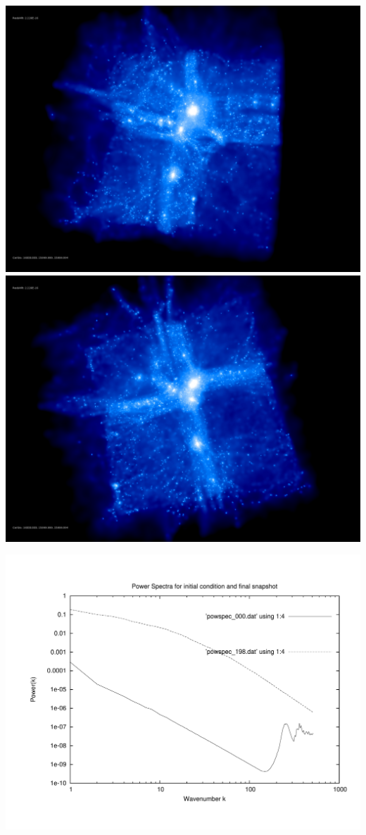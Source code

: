 \includegraphics[scale=0.1]{stages_20/rotate_00074.jpg} 
\includegraphics[scale=0.1]{stages_20/rotate_00131.jpg}

\includegraphics[scale=0.5]{stages_20/plot_powspec_stages_20}

